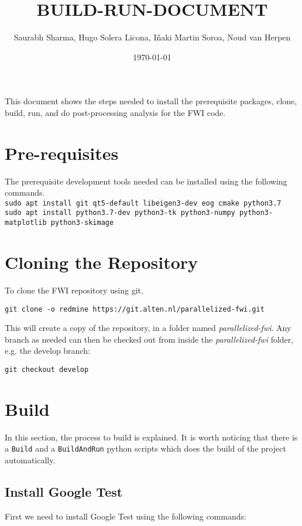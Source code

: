 \documentclass[10pt]{article}
\title{BUILD-RUN-DOCUMENT}
\author{Saurabh Sharma, Hugo Solera Licona, Iñaki Martin Soroa, Noud van Herpen}
\date{\today}
\begin{document}
\maketitle
\noindent This document shows the steps needed to install the prerequisite packages, clone, build, run, and do post-processing analysis for the FWI code.

\section{Pre-requisites}
The prerequisite development tools needed can be installed using the following commands.\\

\noindent \texttt{sudo apt install git qt5-default libeigen3-dev eog cmake python3.7}\\
\texttt{sudo apt install python3.7-dev python3-tk python3-numpy python3-matplotlib python3-skimage}  


\section{Cloning the Repository}
\noindent To clone the FWI repository using git, 
\newline

\texttt{git clone -o redmine https://git.alten.nl/parallelized-fwi.git} 
\newline

This will create a copy of the repository, in a folder named \textit{parallelized-fwi}. Any branch as needed can then be checked out from inside the \textit{parallelized-fwi} folder, e.g. the develop branch: 
\newline

\texttt{git checkout develop}

\section{Build}
In this section, the process to build is explained. It is worth noticing that there is a \texttt{Build} and a \texttt{BuildAndRun} python scripts which does the build of the project automatically. 


\subsection{Install Google Test}
First we need to install Google Test using the following commands:
\newline
\end{document}
